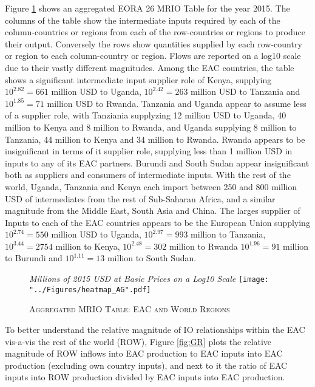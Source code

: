 \documentclass[a4paper]{article}
\begin{document}
Figure \ref{fig:wld} shows an aggregated EORA 26 MRIO Table for the year 2015.  The columns of the table show the intermediate inputs required by each of the column-countries or regions from each of the row-countries or regions to produce their output. Conversely the rows show quantities supplied by each row-country or region to each column-country or region. Flows are reported on a log10 scale due to their vastly different magnitudes. Among the EAC countries, the table shows a significant intermediate input supplier role of Kenya, supplying $10^{2.82} = 661$ million USD to Uganda, $10^{2.42} = 263$ million USD to Tanzania and  $10^{1.85} = 71$ million USD to Rwanda. Tanzania and Uganda appear to assume less of a supplier role, with Tanziania supplyzing 12 million USD to Uganda, 40 million to Kenya and 8 million to Rwanda, and Uganda supplying 8 million to Tanzania, 44 million to Kenya and 34 million to Rwanda. Rwanda appears to be insignificant in terms of it supplier role, supplying less than 1 million USD in inputs to any of its EAC partners. Burundi and South Sudan appear insignificant both as suppliers and consumers of intermediate inputs. With the rest of the world, Uganda, Tanzania and Kenya each import between 250 and 800 million USD of intermediates from the rest of Sub-Saharan Africa, and a similar magnitude from the Middle East, South Asia and China. The larges supplier of Inputs to each of the EAC countries appears to be the European Union supplying $10^{2.74} = 550$ million USD to Uganda, $10^{2.97} = 993$ million to Tanzania, $10^{3.44} = 2754$ million to Kenya, $10^{2.48} = 302$ million to Rwanda  $10^{1.96} = 91$ million to Burundi and $10^{1.11} = 13$ million to South Sudan. 

\begin{figure}[h!]
\centering
\caption{\label{fig:wld}\textsc{Aggregated MRIO Table: EAC and World Regions}}
\small{\textit{Millions of 2015 USD at Basic Prices on a Log10 Scale}}
\texttt{[image: "../Figures/heatmap\_AG".pdf]} %
\end{figure}
\FloatBarrier


To better understand the relative magnitude of IO relationships within the EAC vis-a-vis the rest of the world (ROW), Figure \ref{fig:GR} plots the relative magnitude of ROW inflows into EAC production to EAC inputs into EAC production (excluding own country inputs), and next to it the ratio of EAC inputs into ROW production divided by EAC inputs into EAC production. 
\end{document}
